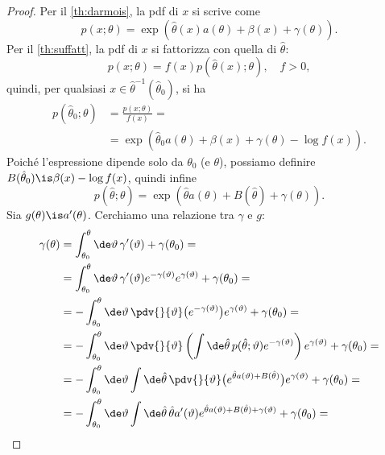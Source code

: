 \begin{proof}
	Per il \autoref{th:darmois},
	la pdf di $x$ si scrive come
	\begin{equation*}
		p(x;\theta)
		= \exp \left( \hat\theta(x)a(\theta) + \beta(x) + \gamma(\theta) \right).
	\end{equation*}
	Per il \autoref{th:suffatt}, la pdf di $x$ si fattorizza con quella di $\hat\theta$:
	\begin{equation*}
		p(x;\theta)
		= f(x) p(\hat\theta(x);\theta), \quad f > 0,
	\end{equation*}
	quindi, per qualsiasi $x\in\hat\theta^{-1}(\hat\theta_0)$, si ha
	\begin{align*}
		p(\hat\theta_0;\theta)
		&= \frac{p(x;\theta)}{f(x)} = \\
		&= \exp \left( \hat\theta_0 a(\theta) + \beta(x) + \gamma(\theta) - \log f(x) \right).
	\end{align*}
	Poiché l'espressione dipende solo da $\theta_0$ (e $\theta$),
	possiamo definire $B(\hat\theta_0)\is\beta(x)-\log f(x)$,
	quindi infine
	\begin{equation*}
		p(\hat\theta;\theta)
		= \exp \left( \hat\theta a(\theta) + B(\hat\theta) + \gamma(\theta) \right).
	\end{equation*}
	Sia $g(\theta)\is a'(\theta)$.
	Cerchiamo una relazione tra $\gamma$ e $g$:
	\begin{align*}
		\gamma(\theta)
		&= \int_{\theta_0}^\theta \de\vartheta\, \gamma'(\vartheta) + \gamma(\theta_0) = \\
		&= \int_{\theta_0}^\theta \de\vartheta\,
		\gamma'(\vartheta) e^{-\gamma(\vartheta)} e^{\gamma(\vartheta)}
		+ \gamma(\theta_0) = \\
		&= - \int_{\theta_0}^\theta \de\vartheta\,
		\pdv{}{\vartheta}\big(e^{-\gamma(\vartheta)}\big) e^{\gamma(\vartheta)}
		+ \gamma(\theta_0) = \\
		&= - \int_{\theta_0}^\theta \de\vartheta\,
		\pdv{}{\vartheta} \left( \int\de\hat\theta\, p(\hat\theta;\vartheta) e^{-\gamma(\vartheta)} \right)
		e^{\gamma(\vartheta)} + \gamma(\theta_0) = \\
		&= - \int_{\theta_0}^\theta \de\vartheta \int\de\hat\theta\,
		\pdv{}{\vartheta} \big( e^{\hat\theta a(\vartheta) + B(\hat\theta)} \big) e^{\gamma(\vartheta)}
		+ \gamma(\theta_0) = \\
		&= - \int_{\theta_0}^\theta \de\vartheta \int\de\hat\theta\,
		\hat\theta a'(\vartheta) e^{\hat\theta a(\vartheta) + B(\hat\theta) + \gamma(\vartheta)}
		+ \gamma(\theta_0) = \\

\end{align*}
\end{proof}
